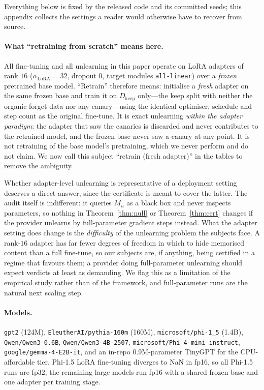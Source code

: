 Everything below is fixed by the released code and its committed seeds; this appendix
collects the settings a reader would otherwise have to recover from source.

\paragraph{What ``retraining from scratch'' means here.} All fine-tuning and all
unlearning in this paper operate on LoRA adapters of rank $16$
($\alpha_{\mathrm{LoRA}} = 32$, dropout $0$, target modules \texttt{all-linear})
over a \emph{frozen} pretrained base model. ``Retrain'' therefore means: initialise a
\emph{fresh} adapter on the same frozen base and train it on
$D_{\text{keep}}$ only---the keep split with neither the organic forget data nor any
canary---using the identical optimiser, schedule and step count as the original
fine-tune. It is exact unlearning \emph{within the adapter paradigm}: the adapter that
saw the canaries is discarded and never contributes to the retrained model, and the
frozen base never saw a canary at any point. It is not retraining of the base model's
pretraining, which we never perform and do not claim. We now call this subject
``retrain (fresh adapter)'' in the tables to remove the ambiguity.

Whether adapter-level unlearning is representative of a deployment setting deserves a
direct answer, since the certificate is meant to cover the latter. The audit itself is
indifferent: it queries $M_u$ as a black box and never inspects parameters, so nothing
in Theorem~\ref{thm:null} or Theorem~\ref{thm:cert} changes if the provider unlearns by
full-parameter gradient steps instead. What the adapter setting does change is the
\emph{difficulty} of the unlearning problem the subjects face. A rank-$16$ adapter has
far fewer degrees of freedom in which to hide memorised content than a full
fine-tune, so our subjects are, if anything, being certified in a regime that favours
them; a provider doing full-parameter unlearning should expect verdicts at least as
demanding. We flag this as a limitation of the empirical study rather than of the
framework, and full-parameter runs are the natural next scaling step.

\paragraph{Models.} \texttt{gpt2} (124M), \texttt{EleutherAI/pythia-160m} (160M),
\texttt{microsoft/phi-1\_5} (1.4B), \texttt{Qwen/Qwen3-0.6B},
\texttt{Qwen/Qwen3-4B-2507}, \texttt{microsoft/Phi-4-mini-instruct},
\texttt{google/gemma-4-E2B-it}, and an in-repo 0.9M-parameter TinyGPT for the
CPU-affordable tier. Phi-1.5 LoRA fine-tuning diverges to NaN in fp16, so all Phi-1.5
runs are fp32; the remaining large models run fp16 with a shared frozen base and one
adapter per training stage.

